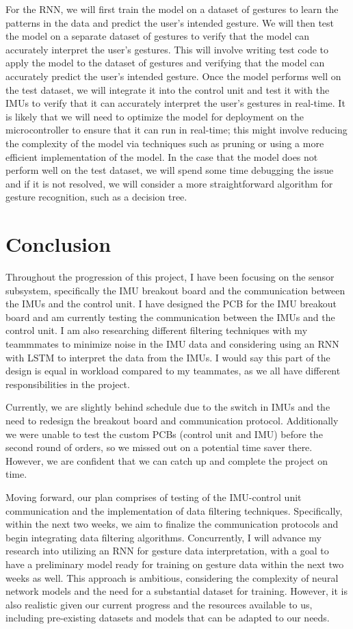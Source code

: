 \documentclass[12pt]{article}
\begin{document}
For the RNN, we will first train the model on a dataset of gestures to learn the patterns in the data and predict the user's intended gesture. We will then test the model on a separate dataset of gestures to verify that the model can accurately interpret the user's gestures. This will involve writing test code to apply the model to the dataset of gestures and verifying that the model can accurately predict the user's intended gesture. Once the model performs well on the test dataset, we will integrate it into the control unit and test it with the IMUs to verify that it can accurately interpret the user's gestures in real-time. It is likely that we will need to optimize the model for deployment on the microcontroller to ensure that it can run in real-time; this might involve reducing the complexity of the model via techniques such as pruning or using a more efficient implementation of the model. In the case that the model does not perform well on the test dataset, we will spend some time debugging the issue and if it is not resolved, we will consider a more straightforward algorithm for gesture recognition, such as a decision tree.
\section{Conclusion}
Throughout the progression of this project, I have been focusing on the sensor subsystem, specifically the IMU breakout board and the communication between the IMUs and the control unit. I have designed the PCB for the IMU breakout board and am currently testing the communication between the IMUs and the control unit. I am also researching different filtering techniques with my teammmates to minimize noise in the IMU data and considering using an RNN with LSTM to interpret the data from the IMUs. I would say this part of the design is equal in workload compared to my teammates, as we all have different responsibilities in the project. 

Currently, we are slightly behind schedule due to the switch in IMUs and the need to redesign the breakout board and communication protocol. Additionally we were unable to test the custom PCBs (control unit and IMU) before the second round of orders, so we missed out on a potential time saver there. However, we are confident that we can catch up and complete the project on time. 

Moving forward, our plan comprises of testing of the IMU-control unit communication and the implementation of data filtering techniques. Specifically, within the next two weeks, we aim to finalize the communication protocols and begin integrating data filtering algorithms. Concurrently, I will advance my research into utilizing an RNN for gesture data interpretation, with a goal to have a preliminary model ready for training on gesture data within the next two weeks as well. This approach is ambitious, considering the complexity of neural network models and the need for a substantial dataset for training. However, it is also realistic given our current progress and the resources available to us, including pre-existing datasets and models that can be adapted to our needs. 
\end{document}
